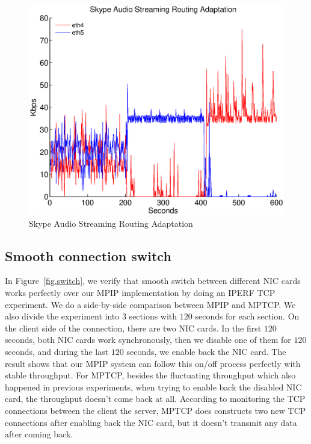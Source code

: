 \begin{figure}
\centering
\includegraphics[width=1\linewidth]{fig/skype.eps}
\caption{Skype Audio Streaming Routing Adaptation}
\label{fig.skype}
\end{figure}


\subsection{Smooth connection switch}
\label{sec:switch}

In Figure~\ref{fig.switch}, we verify that smooth switch between different NIC cards works perfectly over our MPIP implementation by doing an IPERF TCP experiment. We do a side-by-side comparison between MPIP and MPTCP. We also divide the experiment into $3$ sections with $120$ seconds for each section. On the client side of the connection, there are two NIC cards. In the first $120$ seconds, both NIC cards work synchronously, then we disable one of them for $120$ seconds, and during the last $120$ seconds, we enable back the NIC card. The result shows that our MPIP system can follow this on/off process perfectly with stable throughput. For MPTCP, besides the fluctuating throughput which also happened in previous experiments, when trying to enable back the disabled NIC card, the throughput doesn't come back at all. According to monitoring the TCP connections between the client the server, MPTCP does constructs two new TCP connections after enabling back the NIC card, but it doesn't transmit any data after coming back.

